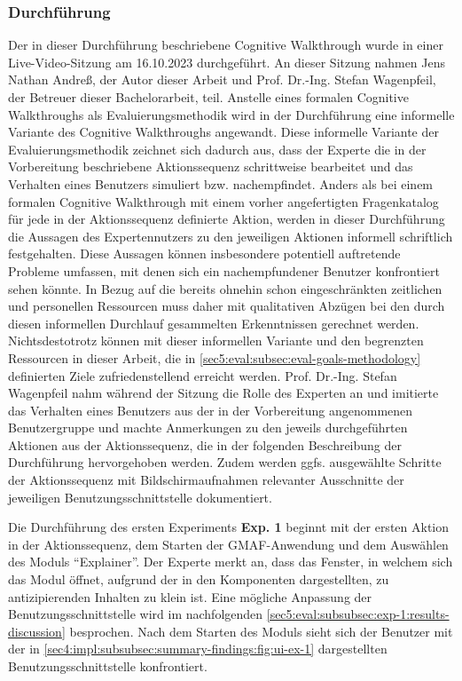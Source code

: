 \subsubsection{Durchführung}
\label{sec5:eval:subsubsec:exp-1:execution}
Der in dieser Durchführung beschriebene Cognitive Walkthrough wurde in einer Live-Video-Sitzung am 16.10.2023 durchgeführt.
An dieser Sitzung nahmen Jens Nathan Andreß, der Autor dieser Arbeit und Prof. Dr.-Ing. Stefan Wagenpfeil, der Betreuer dieser Bachelorarbeit, teil.
Anstelle eines formalen Cognitive Walkthroughs als Evaluierungsmethodik wird in der Durchführung eine informelle Variante des Cognitive Walkthroughs angewandt.
Diese informelle Variante der Evaluierungsmethodik zeichnet sich dadurch aus, dass der Experte die in der Vorbereitung beschriebene Aktionssequenz schrittweise bearbeitet und das Verhalten eines Benutzers simuliert bzw. nachempfindet.
Anders als bei einem formalen Cognitive Walkthrough mit einem vorher angefertigten Fragenkatalog für jede in der Aktionssequenz definierte Aktion, werden in dieser Durchführung die Aussagen des Expertennutzers zu den jeweiligen Aktionen informell schriftlich festgehalten.
Diese Aussagen können insbesondere potentiell auftretende Probleme umfassen, mit denen sich ein nachempfundener Benutzer konfrontiert sehen könnte.
In Bezug auf die bereits ohnehin schon eingeschränkten zeitlichen und personellen Ressourcen muss daher mit qualitativen Abzügen bei den durch diesen informellen Durchlauf gesammelten Erkenntnissen gerechnet werden.
Nichtsdestotrotz können mit dieser informellen Variante und den begrenzten Ressourcen in dieser Arbeit, die in \cref{sec5:eval:subsec:eval-goals-methodology} definierten Ziele zufriedenstellend erreicht werden.
Prof. Dr.-Ing. Stefan Wagenpfeil nahm während der Sitzung die Rolle des Experten an und imitierte das Verhalten eines Benutzers aus der in der Vorbereitung angenommenen Benutzergruppe und machte Anmerkungen zu den jeweils durchgeführten Aktionen aus der Aktionssequenz, die in der folgenden Beschreibung der Durchführung hervorgehoben werden.
Zudem werden ggfs. ausgewählte Schritte der Aktionssequenz mit Bildschirmaufnahmen relevanter Ausschnitte der jeweiligen Benutzungsschnittstelle dokumentiert.

Die Durchführung des ersten Experiments \textbf{Exp. 1} beginnt mit der ersten Aktion in der Aktionssequenz, dem Starten der GMAF-Anwendung und dem Auswählen des Moduls \enquote{Explainer}.
Der Experte merkt an, dass das Fenster, in welchem sich das Modul öffnet, aufgrund der in den Komponenten dargestellten, zu antizipierenden Inhalten zu klein ist.
Eine mögliche Anpassung der Benutzungsschnittstelle wird im nachfolgenden \cref{sec5:eval:subsubsec:exp-1:results-discussion} besprochen.
Nach dem Starten des Moduls sieht sich der Benutzer mit der in \cref{sec4:impl:subsubsec:summary-findings:fig:ui-ex-1} dargestellten Benutzungsschnittstelle konfrontiert.

